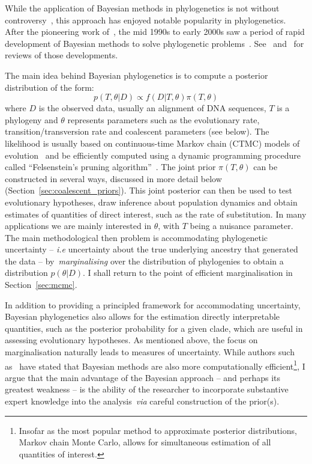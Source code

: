 While the application of Bayesian methods in phylogenetics is not without controversy~\citep{Barker2015}, this approach has enjoyed notable popularity in phylogenetics.
After the pioneering work of~\cite{Kuhner1995}, the mid 1990s to early 2000s saw a period of rapid development of Bayesian methods to solve phylogenetic problems~\citep{Rannala1996,Mau1997,Yang1997,Kuhner1998,Larget1999,Li2000,Suchard2001,Drummond2002}.
See~\cite{Huelsenbeck2001b} and~\cite{Holder2003} for reviews of those developments.

The main idea behind Bayesian phylogenetics is to compute a posterior distribution of the form:
\begin{equation}
 \label{eq:phylo_post_simple}
 p(T, \theta | D) \propto f(D| T, \theta)\pi(T, \theta)
\end{equation}
where $D$ is the observed data, usually an alignment of DNA sequences, $T$ is a phylogeny and $\theta$ represents parameters such as the evolutionary rate, transition/transversion rate and coalescent parameters (see below).
The likelihood is usually based on continuous-time Markov chain (CTMC) models of evolution~\citep{Hasegawa1985,Tavare1986} and be efficiently computed using a dynamic programming  procedure called ``Felsenstein's pruning algorithm''~\citep{Felsenstein1981}.
The joint prior $\pi(T, \theta)$ can be constructed in several ways, discussed in more detail below (Section~\ref{sec:coalescent_priors}).
This joint posterior can then be used to test evolutionary hypotheses, draw inference about population dynamics and obtain estimates of quantities of direct interest, such as the rate of substitution.
In many applications we are mainly interested in $\theta$, with $T$ being a nuisance parameter.
The main methodological then problem is accommodating phylogenetic uncertainty -- \textit{i.e} uncertainty about the true underlying ancestry that generated the data -- by~\textit{marginalising} over the distribution of phylogenies to obtain a distribution $p(\theta | D)$.
I shall return to the point of efficient marginalisation in Section~\ref{sec:mcmc}.

In addition to providing a principled framework for accommodating uncertainty, Bayesian phylogenetics also allows for the estimation directly interpretable  quantities, such as the posterior probability for a given clade, which are useful in assessing evolutionary hypotheses.
As mentioned above, the focus on marginalisation naturally leads to measures of uncertainty.
While authors such as~\cite{Huelsenbeck2002} have stated that Bayesian methods are also more computationally efficient\footnote{Insofar as the most popular method to approximate posterior distributions, Markov chain Monte Carlo, allows for simultaneous estimation of all quantities of interest.}, I argue that the main advantage of the Bayesian approach -- and perhaps its greatest weakness -- is the ability of the researcher to incorporate substantive expert knowledge into the analysis~\textit{via} careful construction of the prior(s).


